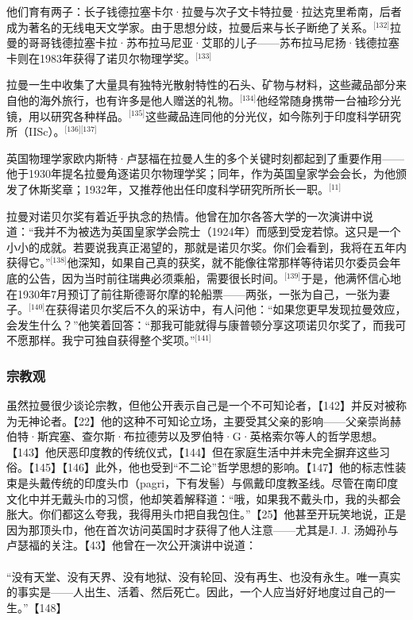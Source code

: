 他们育有两子：长子钱德拉塞卡尔·拉曼与次子文卡特拉曼·拉达克里希南，后者成为著名的无线电天文学家。由于思想分歧，拉曼后来与长子断绝了关系。\(^\text{[132]}\)拉曼的哥哥钱德拉塞卡拉·苏布拉马尼亚·艾耶的儿子——苏布拉马尼扬·钱德拉塞卡则在1983年获得了诺贝尔物理学奖。\(^\text{[133]}\)

拉曼一生中收集了大量具有独特光散射特性的石头、矿物与材料，这些藏品部分来自他的海外旅行，也有许多是他人赠送的礼物。\(^\text{[134]}\)他经常随身携带一台袖珍分光镜，用以研究各种样品。\(^\text{[135]}\)这些藏品连同他的分光仪，如今陈列于印度科学研究所（IISc）。\(^\text{[136][137]}\)

英国物理学家欧内斯特·卢瑟福在拉曼人生的多个关键时刻都起到了重要作用——他于1930年提名拉曼角逐诺贝尔物理学奖；同年，作为英国皇家学会会长，为他颁发了休斯奖章；1932年，又推荐他出任印度科学研究所所长一职。\(^\text{[11]}\)

拉曼对诺贝尔奖有着近乎执念的热情。他曾在加尔各答大学的一次演讲中说道：“我并不为被选为英国皇家学会院士（1924年）而感到受宠若惊。这只是一个小小的成就。若要说我真正渴望的，那就是诺贝尔奖。你们会看到，我将在五年内获得它。”\(^\text{[138]}\)他深知，如果自己真的获奖，就不能像往常那样等待诺贝尔委员会年底的公告，因为当时前往瑞典必须乘船，需要很长时间。\(^\text{[139]}\)于是，他满怀信心地在1930年7月预订了前往斯德哥尔摩的轮船票——两张，一张为自己，一张为妻子。\(^\text{[140]}\)在获得诺贝尔奖后不久的采访中，有人问他：“如果您更早发现拉曼效应，会发生什么？”他笑着回答：“那我可能就得与康普顿分享这项诺贝尔奖了，而我可不愿那样。我宁可独自获得整个奖项。”\(^\text{[141]}\)
\subsubsection{宗教观}
虽然拉曼很少谈论宗教，但他公开表示自己是一个不可知论者，【142】并反对被称为无神论者。【22】他的这种不可知论立场，主要受其父亲的影响——父亲崇尚赫伯特·斯宾塞、查尔斯·布拉德劳以及罗伯特·G·英格索尔等人的哲学思想。【143】他厌恶印度教的传统仪式，【144】但在家庭生活中并未完全摒弃这些习俗。【145】【146】此外，他也受到“不二论”哲学思想的影响。【147】他的标志性装束是头戴传统的印度头巾（pagri，下有发髻）与佩戴印度教圣线。尽管在南印度文化中并无戴头巾的习惯，他却笑着解释道：“哦，如果我不戴头巾，我的头都会胀大。你们都这么夸我，我得用头巾把自我包住。”【25】他甚至开玩笑地说，正是因为那顶头巾，他在首次访问英国时才获得了他人注意——尤其是J. J. 汤姆孙与卢瑟福的关注。【43】他曾在一次公开演讲中说道：\\\\
“没有天堂、没有天界、没有地狱、没有轮回、没有再生、也没有永生。唯一真实的事实是——人出生、活着、然后死亡。因此，一个人应当好好地度过自己的一生。”【148】

